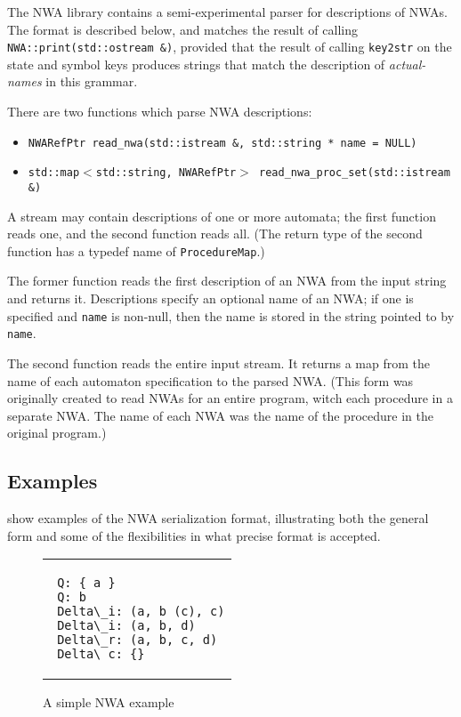 The NWA library contains a semi-experimental parser for descriptions of
NWAs. The format is described below, and matches the result of calling
\texttt{NWA::print(std::ostream \&)}, provided that the result of
calling \texttt{key2str} on the state and symbol keys produces strings
that match the description of \textsl{actual-names} in this grammar.

There are two functions which parse NWA descriptions:
\begin{itemize}
  \item\texttt{NWARefPtr read\_nwa(std::istream \&, std::string * name = NULL)}
  \item\texttt{std::map$<$std::string, NWARefPtr$>$ read\_nwa\_proc\_set(std::istream \&)}
\end{itemize}
A stream may contain descriptions of one or more automata; the first
function reads one, and the second function reads all.  (The return
type of the second function has a typedef name of
\texttt{ProcedureMap}.)

The former function reads the first description of an NWA from the
input string and returns it. Descriptions specify an optional name of
an NWA; if one is specified and \texttt{name} is non-null, then the
name is stored in the string pointed to by \texttt{name}.

The second function reads the entire input stream. It returns a map
from the name of each automaton specification to the parsed NWA. (This
form was originally created to read NWAs for an entire program, witch
each procedure in a separate NWA. The name of each NWA was the name of
the procedure in the original program.)

\subsection{Examples}

 show examples of the NWA serialization format, illustrating
both the general form and some of the flexibilities in what precise
format is accepted.

\begin{figure}
\centering
\begin{tabular}{|p{1.75in}|}
\begin{verbatim}
 Q: { a }
 Q: b
 Delta\_i: (a, b (c), c)
 Delta\_i: (a, b, d)
 Delta\_r: (a, b, c, d)
 Delta\_c: {}
\end{verbatim}
\end{tabular}

  \caption{A simple NWA example}
  \label{Fi:nwa-simple}
\end{figure}

